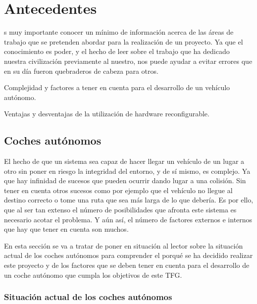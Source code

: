 \chapter{Antecedentes}\label{chap:antecedentes}

s muy importante conocer un mínimo de información acerca de las áreas de trabajo que se pretenden abordar para la realización de un proyecto. Ya que el conocimiento es poder, y el hecho de leer sobre el trabajo que ha dedicado nuestra civilización previamente al nuestro, nos puede ayudar a evitar errores que en su día fueron quebraderos de cabeza para otros.

\begin{definitionlist}
\item[Sección \ref{sec:paradigmaVehiculos}: \nameref{sec:paradigmaVehiculos}]Complejidad y factores a tener en cuenta para el desarrollo de un vehículo autónomo.
\item[Sección \ref{sec:hardwareReconfigurable}: \nameref{sec:hardwareReconfigurable}] Ventajas y desventajas de la utilización de hardware reconfigurable.
\end{definitionlist}

\section{Coches autónomos}\label{sec:paradigmaVehiculos}

El hecho de que un sistema sea capaz de hacer llegar un vehículo de un lugar a otro sin poner en riesgo la integridad del entorno, y de sí mismo, es complejo. Ya que hay infinidad de sucesos que pueden ocurrir dando lugar a una colisión. Sin tener en cuenta otros sucesos como por ejemplo que el vehículo no llegue al destino correcto o tome una ruta  que sea más larga de lo que debería. Es por ello, que al ser tan extenso el número de posibilidades que afronta este sistema es necesario acotar el problema. Y aún así, el número de factores externos e internos que hay que tener en cuenta son muchos.

En esta sección se va a tratar de poner en situación al lector sobre la situación actual de los coches autónomos para comprender el porqué se ha decidido realizar este proyecto y de los factores que se deben tener en cuenta para el desarrollo de un coche autónomo que cumpla los objetivos de este \ac{TFG}.

\subsection{Situación actual de los coches autónomos}

